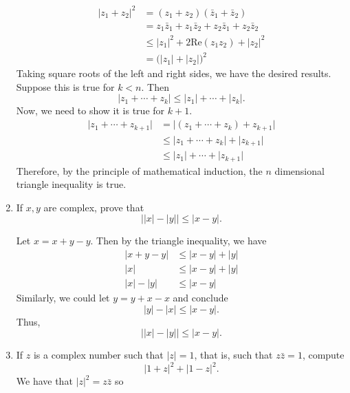 \begin{enumerate}
  \begin{align*}
    \lvert z_1 + z_2\rvert^2 & = (z_1 + z_2)(\bar{z}_1 + \bar{z}_2)\\
                             & = z_1\bar{z}_1 + z_1\bar{z}_2 + z_2\bar{z}_1 +
                               z_2\bar{z}_2\\
                             & \leq\lvert z_1\rvert^2 + 2\text{Re}(z_1z_2) +
                               \lvert z_2\rvert^2\\
                             & = \bigl(\lvert z_1\rvert + \lvert
                               z_2\rvert\bigr)^2 
  \end{align*}
  Taking square roots of the left and right sides, we have the desired results.
  Suppose this is true for \(k < n\).
  Then
  \[
  \lvert z_1 + \cdots + z_k\rvert\leq\lvert z_1\rvert + \cdots +
  \lvert z_k\rvert.
  \]
  Now, we need to show it is true for \(k + 1\).
  \begin{align*}
    \lvert z_1 + \cdots + z_{k + 1}\rvert
    & = \lvert (z_1 + \cdots + z_k) + z_{k + 1}\rvert\\
    & \leq\lvert z_1 + \cdots + z_k\rvert + \lvert z_{k + 1}\rvert\\
    & \leq\lvert z_1\rvert + \cdots + \lvert z_{k + 1}\rvert
  \end{align*}
  Therefore, by the principle of mathematical induction, the \(n\) dimensional
  triangle inequality is true.
\item
  If \(x, y\) are complex, prove that
  \[
  \bigl\lvert\lvert x\rvert - \lvert y\rvert\bigr\rvert\leq\lvert x - y\rvert.
  \]
  \par\smallskip
  Let \(x = x + y - y\).
  Then by the triangle inequality, we have
  \begin{align*}
    \lvert x + y - y\rvert
    & \leq \lvert x - y\rvert + \lvert y\rvert\\
    \lvert x\rvert & \leq \lvert x - y\rvert + \lvert y\rvert\\
    \lvert x\rvert - \lvert y\rvert & \leq \lvert x - y\rvert
  \end{align*}
  Similarly, we could let \(y = y + x - x\) and conclude
  \[
  \lvert y\rvert - \lvert x\rvert\leq\lvert x - y\rvert.
  \]
  Thus,
  \[
  \bigl\lvert\lvert x\rvert - \lvert y\rvert\bigr\rvert\leq\lvert x - y\rvert.
  \]
\item
  If \(z\) is a complex number such that \(\lvert z\rvert = 1\), that is, such
  that \(z\bar{z} = 1\), compute
  \[
  \lvert 1 + z\rvert^2 + \lvert 1 - z\rvert^2.
  \]
  We have that \(\lvert z\rvert^2 = z\bar{z}\) so

\end{enumerate}
